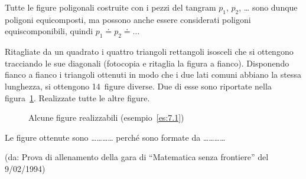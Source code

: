 Tutte le figure poligonali costruite con i pezzi del tangram $p_1$, 
$p_2$, \ldots{} sono dunque poligoni equicomposti, ma possono anche 
essere considerati poligoni equiscomponibili, quindi $p_1 \doteq p_2 
\doteq \ldots{}$

\noindent\begin{minipage}{0.65\textwidth}\parindent15pt
\begin{esempio}\label{es:7.1}
Ritagliate da un quadrato i quattro triangoli rettangoli isosceli che 
si ottengono tracciando le sue diagonali (fotocopia e ritaglia la 
figura a fianco). Disponendo fianco a fianco i triangoli ottenuti in 
modo che i due lati comuni abbiano la stessa lunghezza, si ottengono 
14~figure diverse. Due di esse sono riportate nella 
figura~\ref{fig:quadrato2}. Realizzate tutte le altre figure.
\end{esempio}
\end{minipage}\hfil
\begin{minipage}{0.35\textwidth}
  \centering
\end{minipage}\vspace{5pt}


\begin{inaccessibleblock}
 \begin{figure}[!htb]
\centering
\caption{Alcune figure realizzabili 
(esempio~\ref{es:7.1})}\label{fig:quadrato2}
\end{figure}
\end{inaccessibleblock}

Le figure ottenute sono \ldots\ldots\ldots\ldots{} perché sono 
formate da \ldots\ldots\ldots\ldots{}

\noindent(da: Prova di allenamento della gara di ``Matematica senza 
frontiere'' del 9/02/1994)

